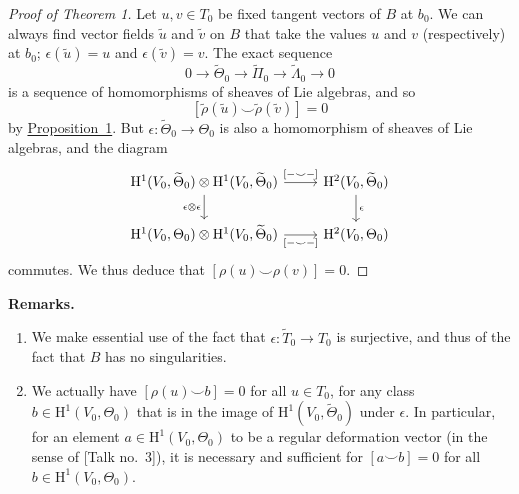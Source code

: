 \documentclass{article}
\newenvironment{rmenv}[1]
  {\phantomsection\par\medskip\noindent\textbf{#1.}\rmfamily}
  {\par\medskip}
\newcommand{\HH}{\mathrm{H}}
\newcommand{\oldpage}[1]{\marginpar{\footnotesize$\Big\vert$ \textit{p.~#1}}}
\begin{document}
\begin{proof}[Proof of Theorem 1]
  Let $u,v\in T_0$ be fixed tangent vectors of $B$ at $b_0$.
  We can always find vector fields $\widetilde{u}$ and $\widetilde{v}$ on $B$ that take the values $u$ and $v$ (respectively) at $b_0$;
  $\epsilon(\widetilde{u})=u$ and $\epsilon(\widetilde{v})=v$.
  The exact sequence
  \[
    0 \to
    \widetilde{\Theta}_0 \to
    \widetilde{\Pi}_0 \to
    \widetilde{\Lambda}_0 \to
    0
  \]
  is a sequence of homomorphisms of sheaves of Lie algebras, and so
  \[
    [\widetilde{\rho}(\widetilde{u})\smile\widetilde{\rho}(\widetilde{v})] = 0
  \]
  by \hyperref[proposition1]{Proposition~1}.
  But $\epsilon\colon\widetilde{\Theta}_0\to\Theta_0$ is also a homomorphism of sheaves of Lie algebras, and the diagram
  \[
    \begin{tikzcd}
      \HH^1(V_0,\widetilde{\Theta}_0)\otimes\HH^1(V_0,\widetilde{\Theta}_0) \rar["{[-\smile-]}"] \dar[swap,"\epsilon\otimes\epsilon"]
      & \HH^2(V_0,\widetilde{\Theta}_0) \dar["\epsilon"]
    \\\HH^1(V_0,\Theta_0)\otimes\HH^1(V_0,\widetilde{\Theta}_0) \rar[swap,"{[-\smile-]}"]
      & \HH^2(V_0,\Theta_0)
    \end{tikzcd}
  \]
  commutes.
  We thus deduce that $[\rho(u)\smile\rho(v)]=0$.
\end{proof}

\oldpage{4-05}
\begin{rmenv}{Remarks}
  \begin{enumerate}
    \item We make essential use of the fact that $\epsilon\colon\widetilde{T}_0\to T_0$ is surjective, and thus of the fact that $B$ has no singularities.
    \item We actually have $[\rho(u)\smile b]=0$ for all $u\in T_0$, for any class $b\in\HH^1(V_0,\Theta_0)$ that is in the image of $\HH^1(V_0,\widetilde{\Theta}_0)$ under $\epsilon$.
    In particular, for an element $a\in\HH^1(V_0,\Theta_0)$ to be a regular deformation vector (in the sense of [Talk no.~3]), it is necessary and sufficient for $[a\smile b]=0$ for all $b\in\HH^1(V_0,\Theta_0)$.
  \end{enumerate}
\end{rmenv}
\end{document}
